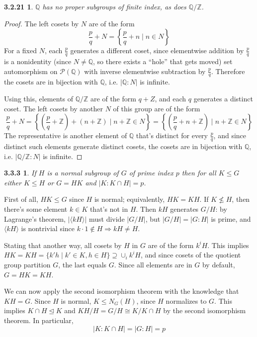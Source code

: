 \documentclass{article}
\newtheorem*{3.2.21}{3.2.21}
\newtheorem*{3.3.3}{3.3.3}
\begin{document}
\begin{3.2.21}
  $\mathbb{Q}$ has no proper subgroups of finite index, as does $\mathbb{Q} / \mathbb{Z}$.
\end{3.2.21}

\begin{proof}
  The left cosets by $N$ are of the form
  \[
    \frac{p}{q} + N = \left\{\frac{p}{q} + n \mid n \in N \right\}
  \]
  For a fixed $N$, each $\frac{p}{q}$ generates a different coset, since elementwise addition by $\frac{p}{q}$ is a nonidentity (since $N\neq \mathbb{Q}$,
  so there exists a ``hole'' that gets moved) set automorphism on $\mathcal{P}(\mathbb{Q})$ with inverse elementwise subtraction by $\frac{p}{q}$.
  Therefore the cosets are in bijection with $\mathbb{Q}$, i.e. $|\mathbb{Q} : N|$ is infinite.

  Using this, elements of $\mathbb{Q} / \mathbb{Z}$ are of the form $q + Z$, and each $q$ generates a distinct coset.
  The left cosets by another $N$ of this group are of the form
  \[
    \frac{p}{q} + N = \left\{ (\frac{p}{q} + \mathbb{Z}) + (n + \mathbb{Z}) \mid n + \mathbb{Z} \in N\right\}
    = \left\{ (\frac{p}{q} + n + \mathbb{Z})  \mid n + \mathbb{Z} \in N\right\}
  \]
  The representative is another element of $\mathbb{Q}$ that's distinct for every $\frac{p}{q}$, and since distinct such elements generate distinct cosets,
  the cosets are in bijection with $\mathbb{Q}$, i.e. $|\mathbb{Q} / \mathbb{Z} : N|$ is infinite.
\end{proof}

\begin{3.3.3}
  If $H$ is a normal subgroup of $G$ of prime index $p$ then for all $K \leq G$ either $K \leq H$ or $G = HK$ and $|K : K \cap H| = p$.
\end{3.3.3}

First of all, $HK \leq G$ since $H$ is normal; equivalently, $HK = KH$.
If $K \not\leq H$, then there's some element $k \in K$ that's not in $H$.
Then $kH$ generates $G / H$: by Lagrange's theorem, $|\langle kH \rangle|$ must divide $|G / H|$, but $|G / H| = |G : H|$ is prime,
and $\langle kH \rangle$ is nontrivial since $k\cdot 1 \not\in H \Rightarrow kH \neq H$.

Stating that another way, all cosets by $H$ in $G$ are of the form $k^{i}H$.
This implies $HK = KH = \{k'h \mid k'\in K, h \in H\} \supseteq \cup_{i} k^{i}H$, and since cosets of the quotient group partition $G$, the last equals $G$.
Since all elements are in $G$ by default, $G = HK = KH$.


We can now apply the second isomorphism theorem with the knowledge that $KH = G$.
Since $H$ is normal, $K \leq N_{G}(H)$, since $H$ normalizes to $G$.
This implies $K \cap H \trianglelefteq K$ and $KH / H = G / H \cong K / K \cap H$ by the second isomorphism theorem.
In particular,
\[
  |K : K \cap H| = |G : H| = p
\]
\end{document}
